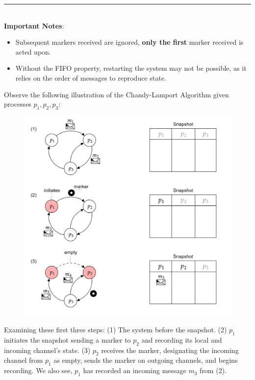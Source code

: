 \begin{Def}
    \noindent
    \rule{\textwidth}{0.4pt}\\

    \noindent
    \textbf{Important Notes}:
    \begin{itemize}
        \item Subsequent markers received are ignored, \textbf{only the first} marker received is acted upon.
        \item Without the FIFO property, restarting the system may not be possible, as it relies on the order of messages to 
        reproduce state.
    \end{itemize}
\end{Def}

\newpage 

\noindent 
Observe the following illustration of the Chandy-Lamport Algorithm given processes $p_1, p_2, p_3$:
\begin{figure}[h] 
    \centering
    \includegraphics[width=1\textwidth]{Sections/snap/snap_exe.png}
\end{figure}

\noindent
Examining these first three steps: (1) The system before the snapshot. (2) $p_1$ initiates the snapshot sending a marker to $p_2$ and recording its local and incoming channel's state. 
(3) $p_2$ receives the marker, designating the incoming channel from $p_1$ as empty, sends the marker on outgoing channels, and begins recording. We also see, $p_1$ has recorded an incoming message $m_3$ from (2).\\

